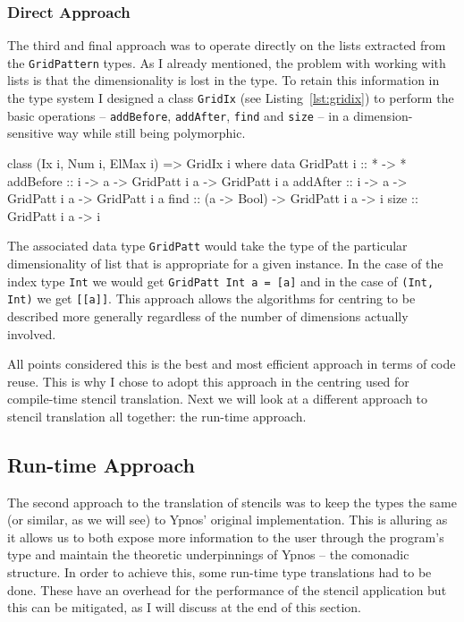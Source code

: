 \documentclass[12pt,a4paper,oneside]{scrbook}
\begin{document}
\subsubsection{Direct Approach}

The third and final approach was to operate directly on the lists extracted from
the \texttt{GridPattern} types. As I already mentioned, the problem with working
with lists is that the dimensionality is lost in the type. To retain this
information in the type system I designed a class \texttt{GridIx} (see
Listing~\ref{lst:gridix}) to perform the basic operations -- \texttt{addBefore},
\texttt{addAfter}, \texttt{find} and \texttt{size} -- in a dimension-sensitive
way while still being polymorphic.

\begin{hflisting}[label={lst:gridix}, caption=The class declaration of
  \texttt{GridIx} showing the main functions defined for the grid manipulation.]
class (Ix i, Num i, ElMax i) => GridIx i where
    data GridPatt i :: * -> *
    addBefore :: i -> a -> GridPatt i a -> GridPatt i a
    addAfter :: i -> a -> GridPatt i a -> GridPatt i a
    find :: (a -> Bool) -> GridPatt i a -> i
    size :: GridPatt i a -> i
\end{hflisting}

The associated data type \texttt{GridPatt} would take the type of the particular
dimensionality of list that is appropriate for a given instance. In the case of
the index type \texttt{Int} we would get \texttt{GridPatt Int a = {[}a{]}} and
in the case of \texttt{(Int, Int)} we get \texttt{{[}{[}a{]}{]}}. This approach
allows the algorithms for centring to be described more generally regardless of
the number of dimensions actually involved.

All points considered this is the best and most efficient approach in terms of
code reuse. This is why I chose to adopt this approach in the centring used for
compile-time stencil translation. Next we will look at a different approach to
stencil translation all together: the run-time approach.

\subsection{Run-time Approach}
\label{sec:runtimetrans}

The second approach to the translation of stencils was to keep the types the
same (or similar, as we will see) to Ypnos' original implementation.  This is
alluring as it allows us to both expose more information to the user through the
program's type and maintain the theoretic underpinnings of Ypnos -- the
comonadic structure. In order to achieve this, some run-time type translations
had to be done. These have an overhead for the performance of the stencil
application but this can be mitigated, as I will discuss at the end of this
section.
\end{document}
